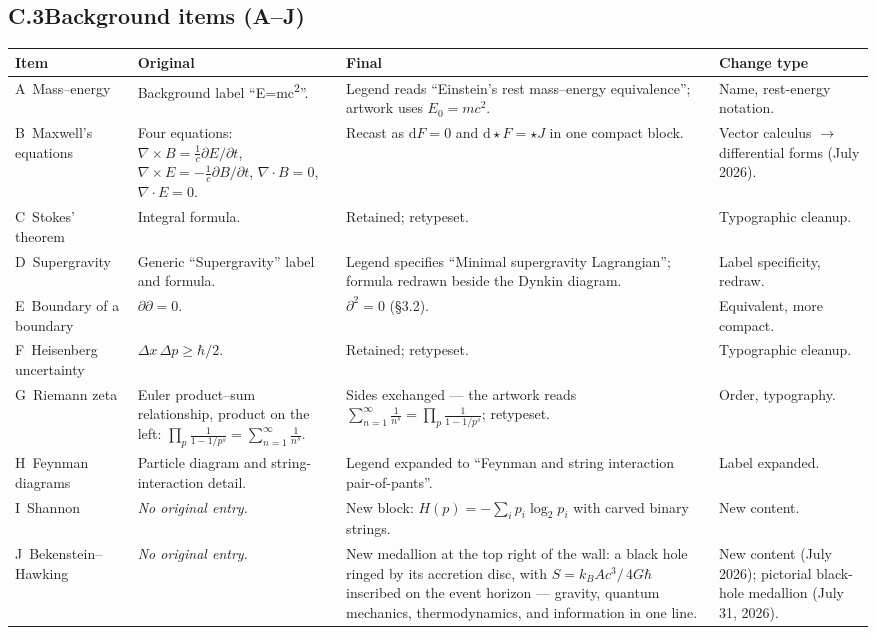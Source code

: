 \documentclass[10pt]{article}
\begin{document}
\subsection*{C.3\quad Background items (A--J)}
\begin{longtable}{@{}L{2.55cm} L{4.6cm} L{5.5cm} L{2.9cm}@{}}
\toprule
\textbf{Item} & \textbf{Original} & \textbf{Final} & \textbf{Change type}\\
\midrule
\endhead
A~Mass--energy & Background label ``E=mc\textsuperscript{2}''. & Legend
  reads ``Einstein's rest mass--energy equivalence''; artwork uses
  $E_0 = mc^2$. & Name, rest-energy notation.\\
B~Maxwell's equations & Four equations: $\nabla\times B =
  \frac{1}{c}\partial E/\partial t$, $\nabla\times E =
  -\frac{1}{c}\partial B/\partial t$, $\nabla\cdot B = 0$,
  $\nabla\cdot E = 0$. & Recast as $\mathrm{d}F = 0$ and
  $\mathrm{d}{\star}F = {\star}J$ in one compact block. & Vector
  calculus $\rightarrow$ differential forms (July 2026).\\
C~Stokes' theorem & Integral formula. & Retained; retypeset. &
  Typographic cleanup.\\
D~Supergravity & Generic ``Supergravity'' label and formula. & Legend
  specifies ``Minimal supergravity Lagrangian''; formula redrawn beside
  the Dynkin diagram. & Label specificity, redraw.\\
E~Boundary of a boundary & $\partial\partial = 0$. & $\partial^2 = 0$
  (\S3.2). & Equivalent, more compact.\\
F~Heisenberg uncertainty & $\Delta x\,\Delta p \ge \hbar/2$. &
  Retained; retypeset. & Typographic cleanup.\\
G~Riemann zeta & Euler product--sum relationship, product on the left:
  $\prod_p \frac{1}{1-1/p^s} = \sum_{n=1}^{\infty} \frac{1}{n^s}$. &
  Sides exchanged --- the artwork reads
  $\sum_{n=1}^{\infty} \frac{1}{n^s} = \prod_p \frac{1}{1-1/p^s}$;
  retypeset. & Order, typography.\\
H~Feynman diagrams & Particle diagram and string-interaction detail. &
  Legend expanded to ``Feynman and string interaction
  pair-of-pants''. & Label expanded.\\
I~Shannon & \emph{No original entry.} & New block:
  $H(p) = -\sum_i p_i \log_2 p_i$ with carved binary strings. & New
  content.\\
J~Bekenstein--Hawking & \emph{No original entry.} & New medallion at
  the top right of the wall: a black hole ringed by its accretion disc,
  with $S = k_B A c^3\!/\,4G\hbar$ inscribed on the event horizon ---
  gravity, quantum mechanics, thermodynamics, and information in one
  line. & New content (July 2026); pictorial black-hole medallion (July
  31, 2026).\\
\bottomrule
\end{longtable}
\end{document}
